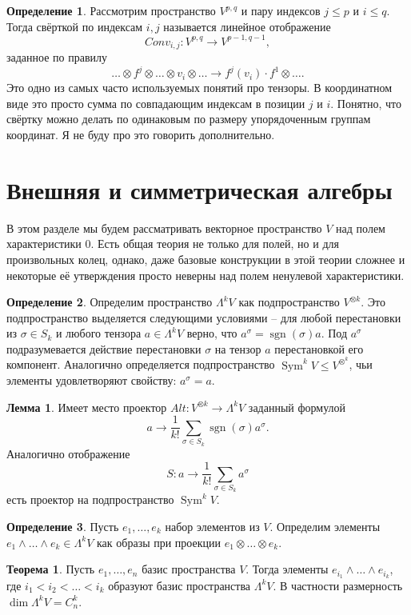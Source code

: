 \documentclass[10pt,a4paper,oneside]{book}
\theoremstyle{definition}
\newtheorem*{defn}{{\color{yellow!20!red} Определение}}
\newtheorem{thm}{{\color{red!40!black} Теорема}}
\newtheorem{lem}{Лемма}
\newcommand{\Sym}{\operatorname{Sym}}
\newcommand{\sgn}{\operatorname{sgn}}
\def\thrm{\begin{thm}}
\def\ethrm{\end{thm}}
\def\dfn{\begin{defn}}
\def\edfn{\end{defn}}
\def\lm{\begin{lem}}
\def\elm{\end{lem}}
\begin{document}
\dfn Рассмотрим пространство $V^{p,q}$ и пару индексов $j\leq p$ и $i\leq q$. Тогда свёрткой по индексам $i,j$ называется линейное отображение 
$$Conv_{i,j} \colon V^{p,q}\to V^{p-1,q-1},$$
заданное по правилу 
$$ \dots \otimes f^j\otimes \dots \otimes v_i \otimes \dots \to f^j(v_i)\cdot f^1\otimes \dots.$$
Это одно из самых часто используемых понятий про тензоры. В координатном виде это просто сумма по совпадающим индексам в позиции $j$ и $i$. Понятно, что свёртку можно делать по одинаковым по размеру упорядоченным группам координат. Я не буду про это говорить дополнительно.
\edfn




\section{Внешняя и симметрическая алгебры}

В этом разделе мы будем рассматривать векторное пространство $V$ над полем характеристики $0$. Есть общая теория не только для полей, но и для произвольных колец, однако, даже базовые конструкции в этой теории сложнее и некоторые её утверждения просто неверны над полем ненулевой характеристики.

\dfn Определим пространство $\Lambda^k V$ как подпространство $V^{\otimes k}$. Это подпространство выделяется следующими условиями -- для любой перестановки из $\sigma \in S_k$ и любого тензора $a\in \Lambda^k V$ верно, что $a^{\sigma}=\sgn(\sigma)a$. Под $a^{\sigma}$ подразумевается действие перестановки $\sigma$ на тензор $a$ перестановкой его компонент. Аналогично определяется подпространство $\Sym^k V \leq V^{\otimes^k}$, чьи элементы удовлетворяют свойству: $a^{\sigma}=a$.
\edfn

\lm Имеет место проектор $Alt \colon V^{\otimes k} \to \Lambda^k V$ заданный формулой 
$$a \to \frac{1}{k!} \sum_{\sigma \in S_k} \sgn (\sigma) a^{\sigma}.$$
Аналогично отображение  
$$S\colon a \to \frac{1}{k!} \sum_{\sigma \in S_k} a^{\sigma}$$
есть проектор на подпространство $\Sym^k V$.
\elm

\dfn Пусть $e_1,\dots, e_k$ набор элементов из $V$. Определим элементы $e_1\wedge \dots \wedge e_k \in \Lambda^k V$ как образы при проекции $e_1\otimes \dots \otimes e_k$.
\edfn

\thrm Пусть $e_1,\dots, e_n$ базис пространства $V$. Тогда элементы $e_{i_1}\wedge \dots \wedge e_{i_k}$, где $i_1<i_2< \dots < i_k$ образуют базис пространства $\Lambda^k V$. В частности размерность $\dim \Lambda^k V = C^k_n$.
\ethrm
\end{document}
